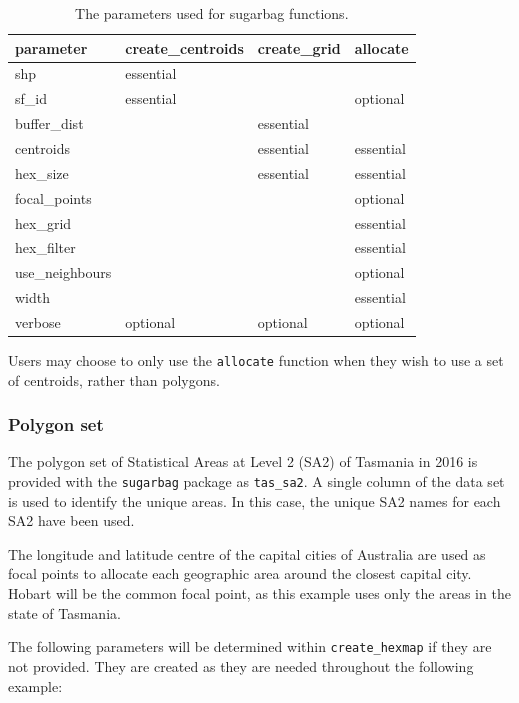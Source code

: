\documentclass{monashthesis}
\begin{document}
\begin{table}[!h]

\caption{\label{tab:parameters}The parameters used for sugarbag functions.}
\centering
\begin{tabular}[t]{llll}
\toprule
parameter & create\_centroids & create\_grid & allocate\\
\midrule
shp & essential &  & \\
sf\_id & essential &  & optional\\
\addlinespace
buffer\_dist &  & essential & \\
centroids &  & essential & essential\\
\addlinespace
hex\_size &  & essential & essential\\
focal\_points &  &  & optional\\
hex\_grid &  &  & essential\\
\addlinespace
hex\_filter &  &  & essential\\
use\_neighbours &  &  & optional\\
\addlinespace
width &  &  & essential\\
verbose & optional & optional & optional\\
\bottomrule
\end{tabular}
\end{table}

Users may choose to only use the \texttt{allocate} function when they wish to use a set of centroids, rather than \autocite{sf} polygons.

\hypertarget{polygon-set}{%
\subsubsection{Polygon set}\label{polygon-set}}

The polygon set of Statistical Areas at Level 2 (SA2) \autocite{abs2016} of Tasmania in 2016 is provided with the \texttt{sugarbag} package as \texttt{tas\_sa2}.
A single column of the data set is used to identify the unique areas.
In this case, the unique SA2 names for each SA2 have been used.

The longitude and latitude centre of the capital cities of Australia are used as focal points to allocate each geographic area around the closest capital city. Hobart will be the common focal point, as this example uses only the areas in the state of Tasmania.

The following parameters will be determined within \texttt{create\_hexmap} if they are not provided. They are created as they are needed throughout the following example:
\end{document}
